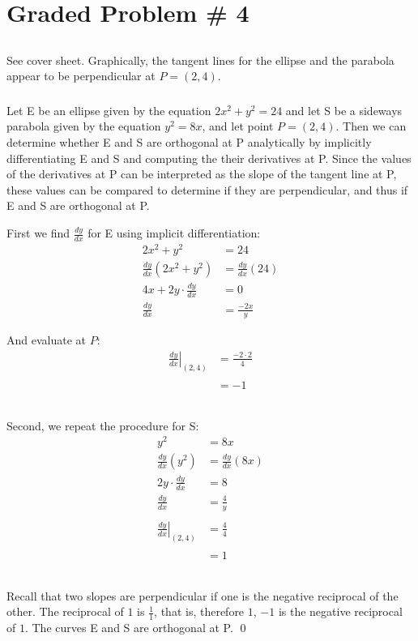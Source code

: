 \documentclass{article}
\begin{document}
\section*{Graded Problem \# 4}

\subsection{}
\subsubsection{}
See cover sheet. Graphically, the tangent lines for the ellipse and the parabola appear to be perpendicular at $P = (2,4)$.

\subsubsection{}
Let E be an ellipse given by the equation $2x^2 + y^2 = 24$ and let S be a sideways parabola given by the equation $y^2=8x$, and let point $P = (2,4)$. Then we can determine whether E and S are orthogonal at P analytically by implicitly differentiating E and S and computing the their derivatives at P. Since the values of the derivatives at P can be interpreted as the slope of the tangent line at P, these values can be compared to determine if they are perpendicular, and thus if E and S are orthogonal at P.

First we find $\frac{dy}{dx}$ for E using implicit differentiation:
\begin{align*}
  2x^2 + y^2 &= 24\\
  \frac{dy}{dx}(2x^2 + y^2) &= \frac{dy}{dx}(24)\\
  4x + 2y \cdot \frac{dy}{dx} &= 0\\
  \frac{dy}{dx} &= \boxed{ \frac{-2x}{y} }
\end{align*}

And evaluate at $P$:
\begin{align*}
  \left. \frac{dy}{dx} \right\rvert_{(2,4)} &= \frac{-2 \cdot 2}{4}\\
  \phantom{\left. \frac{dy}{dx} \right\rvert_{(2,4)}} &= \boxed{-1}\\
\end{align*}

Second, we repeat the procedure for S:
\begin{align*}
  y^2 &= 8x \\
  \frac{dy}{dx}(y^2) &= \frac{dy}{dx}(8x) \\
  2y \cdot \frac{dy}{dx} &= 8 \\
  \frac{dy}{dx} &= \boxed{\frac{4}{y}} \\
  \\
  \left. \frac{dy}{dx} \right\rvert_{(2,4)} &= \frac{4}{4} \\
  \phantom{\left. \frac{dy}{dx} \right\rvert_{(2,4)}} &= \boxed{1} \\
\end{align*}

Recall that two slopes are perpendicular if one is the negative reciprocal of the other. The reciprocal of $1$ is $\frac{1}{1}$, that is, therefore $1$, $-1$ is the negative reciprocal of $1$. The curves E and S are orthogonal at P.
\qed
\end{document}
